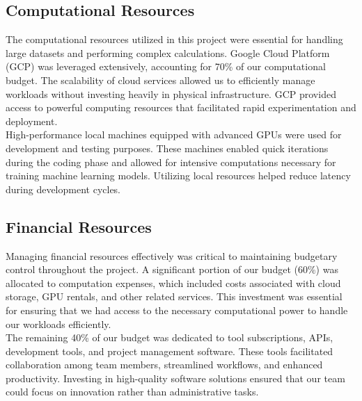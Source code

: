 \subsection{Computational Resources}
The computational resources utilized in this project were essential for handling large datasets and performing complex calculations. Google Cloud Platform (GCP) was leveraged extensively, accounting for 70\% of our computational budget. The scalability of cloud services allowed us to efficiently manage workloads without investing heavily in physical infrastructure. GCP provided access to powerful computing resources that facilitated rapid experimentation and deployment.\\High-performance local machines equipped with advanced GPUs were used for development and testing purposes. These machines enabled quick iterations during the coding phase and allowed for intensive computations necessary for training machine learning models. Utilizing local resources helped reduce latency during development cycles.

\subsection{Financial Resources}
Managing financial resources effectively was critical to maintaining budgetary control throughout the project. A significant portion of our budget (60\%) was allocated to computation expenses, which included costs associated with cloud storage, GPU rentals, and other related services. This investment was essential for ensuring that we had access to the necessary computational power to handle our workloads efficiently.\\The remaining 40\% of our budget was dedicated to tool subscriptions, APIs, development tools, and project management software. These tools facilitated collaboration among team members, streamlined workflows, and enhanced productivity. Investing in high-quality software solutions ensured that our team could focus on innovation rather than administrative tasks.


